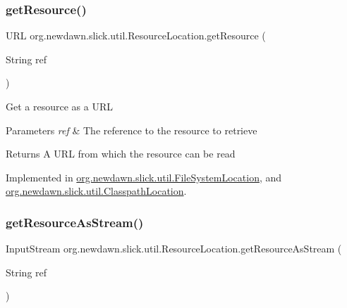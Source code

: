 \subsubsection{\texorpdfstring{get\+Resource()}{getResource()}}
{\footnotesize\ttfamily U\+RL org.\+newdawn.\+slick.\+util.\+Resource\+Location.\+get\+Resource (\begin{DoxyParamCaption}\item[{String}]{ref }\end{DoxyParamCaption})}

Get a resource as a U\+RL


\begin{DoxyParams}{Parameters}
{\em ref} & The reference to the resource to retrieve \\
\hline
\end{DoxyParams}
\begin{DoxyReturn}{Returns}
A U\+RL from which the resource can be read 
\end{DoxyReturn}


Implemented in \mbox{\hyperlink{classorg_1_1newdawn_1_1slick_1_1util_1_1_file_system_location_ad667c6a3c97a76caf89ffa816904033a}{org.\+newdawn.\+slick.\+util.\+File\+System\+Location}}, and \mbox{\hyperlink{classorg_1_1newdawn_1_1slick_1_1util_1_1_classpath_location_a4608719eee9b1ef3b90d7056f7064cde}{org.\+newdawn.\+slick.\+util.\+Classpath\+Location}}.

\mbox{\label{interfaceorg_1_1newdawn_1_1slick_1_1util_1_1_resource_location_a484bade425ef16b2230d28701b2c5e2f}} 
\subsubsection{\texorpdfstring{get\+Resource\+As\+Stream()}{getResourceAsStream()}}
{\footnotesize\ttfamily Input\+Stream org.\+newdawn.\+slick.\+util.\+Resource\+Location.\+get\+Resource\+As\+Stream (\begin{DoxyParamCaption}\item[{String}]{ref }\end{DoxyParamCaption})}

